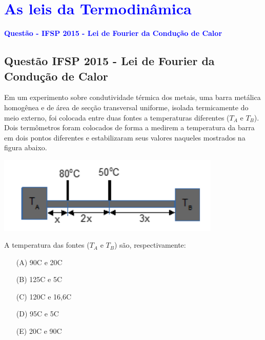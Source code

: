 \section{\large \textcolor{blue}{As leis da Termodinâmica}}

\begin{flushleft}
\textbf{\textcolor{blue}{\Large Quest\~ao - IFSP 2015 - Lei de Fourier da Condu\c{c}\~ao de Calor}}\\
\noindent

\subsection{Quest\~ao IFSP 2015 - Lei de Fourier da Condu\c{c}\~ao de Calor}

Em um experimento sobre condutividade térmica dos metais, uma barra metálica homogênea e de área de secção transversal uniforme, isolada termicamente do meio externo, foi colocada entre duas fontes a temperaturas diferentes ($T_A$ e $T_B$). Dois termômetros foram colocados de forma a medirem a temperatura da barra em dois pontos diferentes e estabilizaram seus valores naqueles mostrados na figura abaixo.

\vspace{0.3cm}

\includegraphics[width=0.8\textwidth]{figures/barra_termica.png}

\vspace{0.3cm}

A temperatura das fontes ($T_A$ e $T_B$) são, respectivamente:

\begin{itemize}
\item[(A)] 90\textdegree C e 20\textdegree C
\item[(B)] 125\textdegree C e 5\textdegree C
\item[(C)] 120\textdegree C e 16,6\textdegree C
\item[(D)] 95\textdegree C e 5\textdegree C
\item[(E)] 20\textdegree C e 90\textdegree C
\end{itemize}


\end{flushleft}
